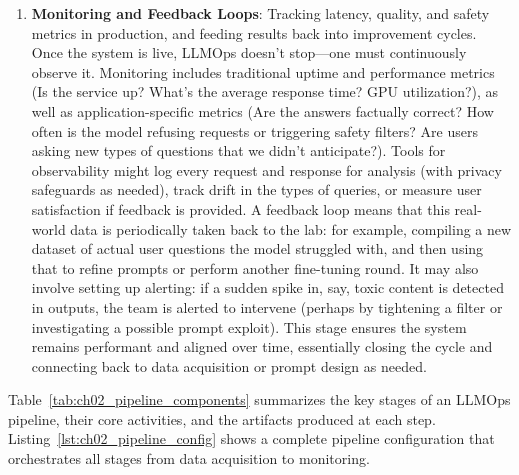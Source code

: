 \begin{enumerate}
\item \textbf{Monitoring and Feedback Loops}: Tracking latency, quality, and safety metrics in production, and feeding results back into improvement cycles. Once the system is live, LLMOps doesn’t stop—one must continuously observe it. Monitoring includes traditional uptime and performance metrics (Is the service up? What’s the average response time? GPU utilization?), as well as application-specific metrics (Are the answers factually correct? How often is the model refusing requests or triggering safety filters? Are users asking new types of questions that we didn’t anticipate?). Tools for observability might log every request and response for analysis (with privacy safeguards as needed), track drift in the types of queries, or measure user satisfaction if feedback is provided. A feedback loop means that this real-world data is periodically taken back to the lab: for example, compiling a new dataset of actual user questions the model struggled with, and then using that to refine prompts or perform another fine-tuning round. It may also involve setting up alerting: if a sudden spike in, say, toxic content is detected in outputs, the team is alerted to intervene (perhaps by tightening a filter or investigating a possible prompt exploit). This stage ensures the system remains performant and aligned over time, essentially closing the cycle and connecting back to data acquisition or prompt design as needed.

\end{enumerate}

Table~\ref{tab:ch02_pipeline_components} summarizes the key stages of an LLMOps pipeline, their core activities, and the artifacts produced at each step. Listing~\ref{lst:ch02_pipeline_config} shows a complete pipeline configuration that orchestrates all stages from data acquisition to monitoring.


